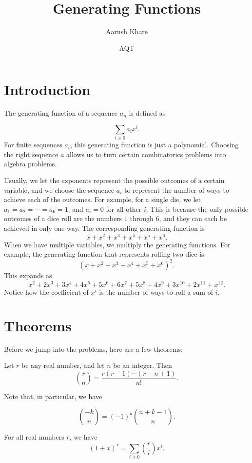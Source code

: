 \documentclass{article}
\title{Generating Functions}
\author{Aarush Khare}
\date{AQT}
\begin{document}
\maketitle
\BgThispage
\section{Introduction}

The generating function of a sequence $a_n$ is defined as

\[\sum_{i\ge 0} a_ix^i.\]
For finite sequences $a_i$, this generating function is just a polynomial. Choosing the right sequence $a$ allows us to turn certain combinatorics problems into algebra problems. 

Usually, we let the exponents represent the possible outcomes of a certain variable, and we choose the sequence $a_i$ to represent the number of ways to achieve each of the outcomes. For example, for a single die, we let $a_1 = a_2 = \cdots = a_6 = 1$, and $a_i = 0$ for all other $i$. This is because the only possible outcomes of a dice roll are the numbers $1$ through $6$, and they can each be achieved in only one way. The corresponding generating function is
\[x + x^2 + x^3 + x^4 + x^5 + x^6.\]
When we have multiple variables, we multiply the generating functions. For example, the generating function that represents rolling two dice is
\[(x + x^2 + x^3 + x^4 + x^5 + x^6)^{2}.\]
This expands as
\[x^2 + 2x^3 + 3x^4 + 4x^5 + 5x^6 + 6x^7 + 5x^8 + 4x^9 + 3x^{10} + 2x^{11} + x^{12}.\]
Notice how the coefficient of $x^i$ is the number of ways to roll a sum of $i$.

\section{Theorems}

Before we jump into the problems, here are a few theorems:

\begin{defi}
Let $r$ be any real number, and let $n$ be an integer. Then
\[\binom{r}{n} = \frac{r(r-1)\cdots (r-n+1)}{n!}.\]

\end{defi}

Note that, in particular, we have

\[\binom{-k}{n} = (-1)^k\binom{n+k-1}{n}.\]

\begin{theo}
For all real numbers $r$, we have
\[(1+x)^r = \sum_{i \ge 0}\binom{r}{i}x^i.\]
\end{theo}
\end{document}
